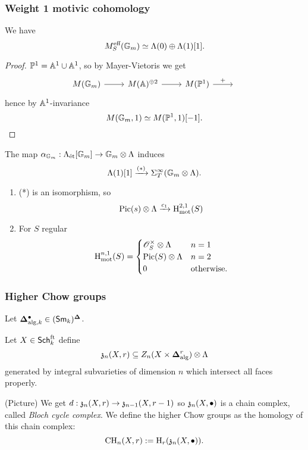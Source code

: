 \subsubsection{Weight 1 motivic cohomology}
\begin{lemma}
We have
\[
M_S^{\text{eff}}(\mathbb{G}_m) \simeq \Lambda(0) \oplus \Lambda(1)[1].
\]
\end{lemma}
\begin{proof}
$\mathbb{P}^{1}=\mathbb A^{1}\cup \mathbb A^{1}$, so by Mayer-Vietoris we get
\[
\begin{tikzcd}
M(\Gm) \ar[r] & M(\Aff)^{\oplus 2} \ar[r] & M(\P^{1}) \ar[r,"+"] & {}
\end{tikzcd}
\]
hence by $\mathbb A^{1}$-invariance
\[
M(\mathbb{G}_m,1) \simeq M(\mathbb{P}^{1},1)[-1].
\]
\end{proof}
The map $\alpha_{\Gm}:\Lambda_{\text{\'et}}[\Gm]\to \Gm\otimes \Lambda$ induces
\[
\Lambda(1)[1] \xrightarrow{(*)} \Sigma_{T}^{\infty} (\mathbb{G}_m\otimes\Lambda).
\]
\begin{theorem}\leavevmode
\begin{enumerate}[1)]
\item (*) is an isomorphism, so
\[
\operatorname{Pic}(s)\otimes \Lambda \xrightarrow{c_1} \mathrm{H}_{\text{mot}}^{2,1}(S)
\]
\item For $S$ regular
\[
\mathrm{H}_{\text{mot}}^{n,1}(S) =
\begin{cases}
\mathscr{O}_S^{\times }\otimes\Lambda & n=1 \\
\operatorname{Pic}(S)\otimes\Lambda & n=2 \\
0 & \text{otherwise}.
\end{cases}
\]
\end{enumerate}
\end{theorem}
\subsubsection{Higher Chow groups}
Let $\mathbf{\Delta}_{\text{alg},k}^{\bullet}\in (\mathsf{Sm}_k)^{\mathbf{\Delta}}$.
\begin{definition}
Let $X\in \mathsf{Sch}_k^{\text{ft}}$ define
\[
\mathfrak{z}_n(X,r) \subseteq Z_n(X\times \mathbf{\Delta}_{\text{alg}}^{r})\otimes\Lambda
\]
generated by integral subvarieties of dimension $n$ which intersect all faces properly.
\end{definition}
(Picture) We get $d:\kz_n(X,r)\to \kz_{n-1}(X,r-1)$ so $\mathfrak{z}_n(X,\bullet)$ is a chain
complex, called \emph{Bloch cycle complex}. We define the higher Chow groups as the
homology of this chain complex:
\[ \operatorname{CH}_n(X,r):= \mathrm{H}_r(\mathfrak{z}_n(X,\bullet)). \]

